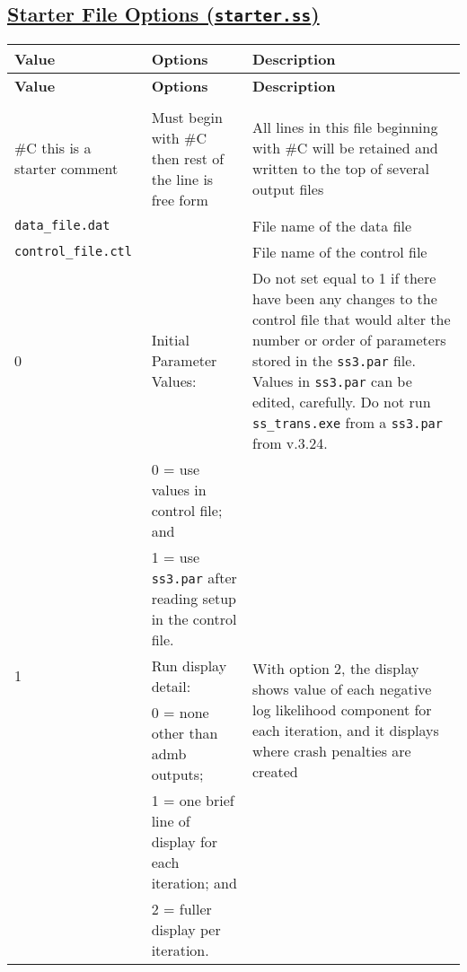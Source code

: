 {
\setlength\extrarowheight{4pt}
\begin{landscape}
\hypertarget{StarterOptions}{}
\subsection[Starter File Options (\texttt{starter.ss})]{\protect\hyperlink{StarterOptions}{Starter File Options (\texttt{starter.ss})}}	

\begin{longtable}{p{1.5cm} p{7.2cm} p{12.3cm}} 

 \hline
 \textbf{Value} & \textbf{Options} & \textbf{Description} \TBstrut\\ 
 \hline
 \endfirsthead
 
 \hline
 \textbf{Value} & \textbf{Options} & \textbf{Description} \TBstrut\\ 
 \hline
 \endhead
 
 \hline
 \endfoot
 
 \hline
 \multicolumn{3}{c}{\textbf{End of Starter File}} \Tstrut\Bstrut\\
 \hline
 \endlastfoot

 \#C this is a starter comment & Must begin with \#C then rest of the line is free form & All lines in this file beginning with \#C will be retained and written to the top of several output files \Tstrut\\
		
 \hline
 \texttt{data\_file.dat} &  & File name of the data file \Tstrut\\
		
 \hline
 \texttt{control\_file.ctl} &  & File name of the control file \Tstrut\\
   
 \hline		
 0 & Initial Parameter Values: & \multirow{1}{12.3cm}[-0.25cm]{\parbox{12.3cm}{Do not set equal to 1 if there have been any changes to the control file that would alter the number or order of parameters stored in the \texttt{ss3.par} file. Values in \texttt{ss3.par} can be edited, carefully. Do not run \texttt{ss\_trans.exe} from a \texttt{ss3.par} from v.3.24.}}\Tstrut\\
 & 0 = use values in control file; and &  \\
 & 1 = use \texttt{ss3.par} after reading setup in the control file. & \\
		
 \hline
 1 & Run display detail: &  \multirow{2}{12.3cm}[-0.25cm]{\parbox{12.3cm}{With option 2, the display shows value of each negative log likelihood component for each iteration, and it displays where crash penalties are created}} \Tstrut\\
   & 0 = none other than \gls{admb} outputs; & \\
   & 1 = one brief line of display for each iteration; and & \\
   & 2 = fuller display per iteration. & \\
		  

\end{longtable}
\end{landscape}}
